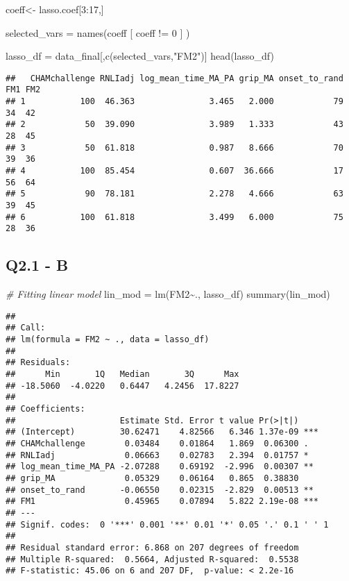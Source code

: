 \documentclass[
]{article}
\newenvironment{Shaded}{\begin{snugshade}}{\end{snugshade}}
\newcommand{\CommentTok}[1]{\textcolor[rgb]{0.56,0.35,0.01}{\textit{#1}}}
\newcommand{\DecValTok}[1]{\textcolor[rgb]{0.00,0.00,0.81}{#1}}
\newcommand{\FunctionTok}[1]{\textcolor[rgb]{0.00,0.00,0.00}{#1}}
\newcommand{\NormalTok}[1]{#1}
\newcommand{\OtherTok}[1]{\textcolor[rgb]{0.56,0.35,0.01}{#1}}
\newcommand{\SpecialCharTok}[1]{\textcolor[rgb]{0.00,0.00,0.00}{#1}}
\newcommand{\StringTok}[1]{\textcolor[rgb]{0.31,0.60,0.02}{#1}}
\begin{document}
\begin{Shaded}
\begin{Highlighting}[]
\NormalTok{coeff}\OtherTok{\textless{}{-}}\NormalTok{ lasso.coef[}\DecValTok{3}\SpecialCharTok{:}\DecValTok{17}\NormalTok{,]}


\NormalTok{selected\_vars }\OtherTok{=} \FunctionTok{names}\NormalTok{(coeff [ coeff }\SpecialCharTok{!=} \DecValTok{0}\NormalTok{ ] )}

\NormalTok{lasso\_df }\OtherTok{=}\NormalTok{ data\_final[,}\FunctionTok{c}\NormalTok{(selected\_vars,}\StringTok{"FM2"}\NormalTok{)]}
\FunctionTok{head}\NormalTok{(lasso\_df)}
\end{Highlighting}
\end{Shaded}

\begin{verbatim}
##   CHAMchallenge RNLIadj log_mean_time_MA_PA grip_MA onset_to_rand FM1 FM2
## 1           100  46.363               3.465   2.000            79  34  42
## 2            50  39.090               3.989   1.333            43  28  45
## 3            50  61.818               0.987   8.666            70  39  36
## 4           100  85.454               0.607  36.666            17  56  64
## 5            90  78.181               2.278   4.666            63  39  45
## 6           100  61.818               3.499   6.000            75  28  36
\end{verbatim}

\hypertarget{q2.1---b}{%
\subsection{Q2.1 - B}\label{q2.1---b}}

\begin{Shaded}
\begin{Highlighting}[]
\CommentTok{\# Fitting linear model}
\NormalTok{lin\_mod }\OtherTok{=} \FunctionTok{lm}\NormalTok{(FM2}\SpecialCharTok{\textasciitilde{}}\NormalTok{., lasso\_df)}
\FunctionTok{summary}\NormalTok{(lin\_mod)}
\end{Highlighting}
\end{Shaded}

\begin{verbatim}
## 
## Call:
## lm(formula = FM2 ~ ., data = lasso_df)
## 
## Residuals:
##      Min       1Q   Median       3Q      Max 
## -18.5060  -4.0220   0.6447   4.2456  17.8227 
## 
## Coefficients:
##                     Estimate Std. Error t value Pr(>|t|)    
## (Intercept)         30.62471    4.82566   6.346 1.37e-09 ***
## CHAMchallenge        0.03484    0.01864   1.869  0.06300 .  
## RNLIadj              0.06663    0.02783   2.394  0.01757 *  
## log_mean_time_MA_PA -2.07288    0.69192  -2.996  0.00307 ** 
## grip_MA              0.05329    0.06164   0.865  0.38830    
## onset_to_rand       -0.06550    0.02315  -2.829  0.00513 ** 
## FM1                  0.45965    0.07894   5.822 2.19e-08 ***
## ---
## Signif. codes:  0 '***' 0.001 '**' 0.01 '*' 0.05 '.' 0.1 ' ' 1
## 
## Residual standard error: 6.868 on 207 degrees of freedom
## Multiple R-squared:  0.5664, Adjusted R-squared:  0.5538 
## F-statistic: 45.06 on 6 and 207 DF,  p-value: < 2.2e-16
\end{verbatim}
\end{document}

